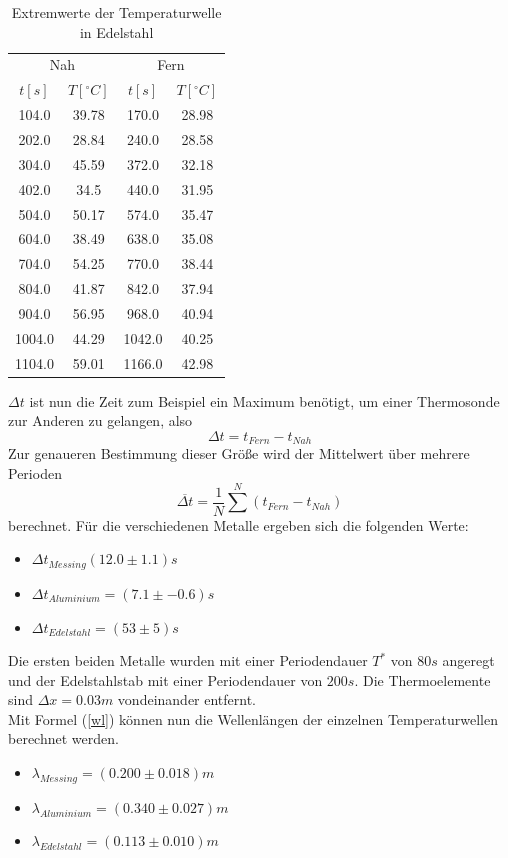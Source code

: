 \documentclass[11pt]{article}
\begin{document}
\begin{table}[P]
\centering
\label{stahl_extr}
\begin{tabular}{c|c||c|c}
\multicolumn{2}{c||}{Nah} & \multicolumn{2}{c}{Fern}\\
$t[s]$ & $T[^\circ C]$ & $t[s]$ & $T[^\circ C]$ \\
\hline
104.0 & 39.78 & 170.0 & 28.98\\
202.0 & 28.84 & 240.0 & 28.58\\
304.0 & 45.59 & 372.0 & 32.18\\
402.0 & 34.5 & 440.0 & 31.95\\
504.0 & 50.17 & 574.0 & 35.47\\
604.0 & 38.49 & 638.0 & 35.08\\
704.0 & 54.25 & 770.0 & 38.44\\
804.0 & 41.87 & 842.0 & 37.94\\
904.0 & 56.95 & 968.0 & 40.94\\
1004.0 & 44.29 & 1042.0 & 40.25\\
1104.0 & 59.01 & 1166.0 & 42.98\\
\end{tabular}
\caption{Extremwerte der Temperaturwelle in Edelstahl}
\end{table}
 $\Delta t$ ist nun die Zeit zum Beispiel ein Maximum benötigt, um einer Thermosonde zur Anderen zu gelangen, also
\begin{equation}
\Delta t = t_{Fern} - t_{Nah}
\end{equation}
Zur genaueren Bestimmung dieser Größe wird der Mittelwert über mehrere Perioden 
\begin{equation}
\overline{\Delta t} = \frac1N \sum^N (t_{Fern}-t_{Nah})
\end{equation}
berechnet. Für die verschiedenen Metalle ergeben sich die folgenden Werte:
\begin{itemize}
\item$\Delta t_{Messing} (12.0\pm1.1)s$
\item $\Delta t_{Aluminium} = (7.1\pm-0.6)s$
\item $\Delta t_{Edelstahl} =  (53\pm5)s$
\end{itemize}
Die ersten beiden Metalle wurden mit einer Periodendauer $T^*$ von $80s$ angeregt und der Edelstahlstab mit einer Periodendauer von $200s$. Die Thermoelemente sind $\Delta x = 0.03m$ vondeinander entfernt. \\Mit Formel (\ref{wl}) können nun die Wellenlängen der einzelnen Temperaturwellen berechnet werden. 
\begin{itemize}
\item $\lambda_{Messing}=(0.200\pm0.018)m$
\item $\lambda_{Aluminium}=(0.340\pm0.027)m$
\item $\lambda_{Edelstahl}=(0.113\pm0.010)m$
\end{itemize}
\end{document}
